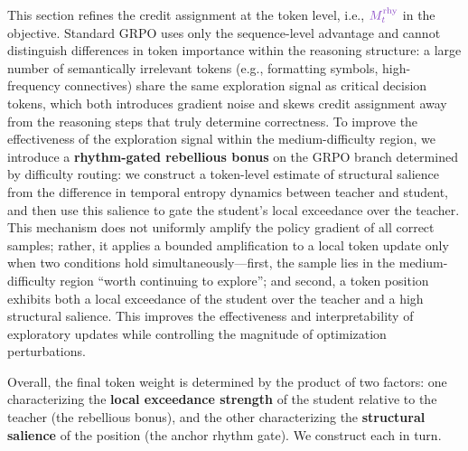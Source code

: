 \documentclass{article}
\begin{document}
This section refines the credit assignment at the token level, i.e., ${\color{cRhythm}M^{\mathrm{rhy}}_{t}}$ in the objective. Standard GRPO uses only the sequence-level advantage and cannot distinguish differences in token importance within the reasoning structure: a large number of semantically irrelevant tokens (e.g., formatting symbols, high-frequency connectives) share the same exploration signal as critical decision tokens, which both introduces gradient noise and skews credit assignment away from the reasoning steps that truly determine correctness. To improve the effectiveness of the exploration signal within the medium-difficulty region, we introduce a \textbf{rhythm-gated rebellious bonus} on the GRPO branch determined by difficulty routing: we construct a token-level estimate of structural salience from the difference in temporal entropy dynamics between teacher and student, and then use this salience to gate the student's local exceedance over the teacher. This mechanism does not uniformly amplify the policy gradient of all correct samples; rather, it applies a bounded amplification to a local token update only when two conditions hold simultaneously---first, the sample lies in the medium-difficulty region ``worth continuing to explore''; and second, a token position exhibits both a local exceedance of the student over the teacher and a high structural salience. This improves the effectiveness and interpretability of exploratory updates while controlling the magnitude of optimization perturbations.

Overall, the final token weight is determined by the product of two factors: one characterizing the \textbf{local exceedance strength} of the student relative to the teacher (the rebellious bonus), and the other characterizing the \textbf{structural salience} of the position (the anchor rhythm gate). We construct each in turn.
\end{document}
